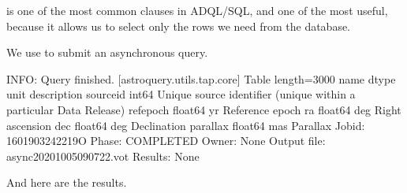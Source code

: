 \documentclass[letterpaper,10pt,english]{sphinxmanual}
\begin{document}
 is one of the most common clauses in ADQL/SQL, and one of the most useful, because it allows us to select only the rows we need from the database.

We use  to submit an asynchronous query.

\begin{sphinxVerbatim}[commandchars=\\\{\}]
  
\end{sphinxVerbatim}

\begin{sphinxVerbatim}[commandchars=\\\{\}]
INFO: Query finished. [astroquery.utils.tap.core]
\PYGZlt{}Table length=3000\PYGZgt{}
   name    dtype  unit                            description                            
\PYGZhy{}\PYGZhy{}\PYGZhy{}\PYGZhy{}\PYGZhy{}\PYGZhy{}\PYGZhy{}\PYGZhy{}\PYGZhy{} \PYGZhy{}\PYGZhy{}\PYGZhy{}\PYGZhy{}\PYGZhy{}\PYGZhy{}\PYGZhy{} \PYGZhy{}\PYGZhy{}\PYGZhy{}\PYGZhy{} \PYGZhy{}\PYGZhy{}\PYGZhy{}\PYGZhy{}\PYGZhy{}\PYGZhy{}\PYGZhy{}\PYGZhy{}\PYGZhy{}\PYGZhy{}\PYGZhy{}\PYGZhy{}\PYGZhy{}\PYGZhy{}\PYGZhy{}\PYGZhy{}\PYGZhy{}\PYGZhy{}\PYGZhy{}\PYGZhy{}\PYGZhy{}\PYGZhy{}\PYGZhy{}\PYGZhy{}\PYGZhy{}\PYGZhy{}\PYGZhy{}\PYGZhy{}\PYGZhy{}\PYGZhy{}\PYGZhy{}\PYGZhy{}\PYGZhy{}\PYGZhy{}\PYGZhy{}\PYGZhy{}\PYGZhy{}\PYGZhy{}\PYGZhy{}\PYGZhy{}\PYGZhy{}\PYGZhy{}\PYGZhy{}\PYGZhy{}\PYGZhy{}\PYGZhy{}\PYGZhy{}\PYGZhy{}\PYGZhy{}\PYGZhy{}\PYGZhy{}\PYGZhy{}\PYGZhy{}\PYGZhy{}\PYGZhy{}\PYGZhy{}\PYGZhy{}\PYGZhy{}\PYGZhy{}\PYGZhy{}\PYGZhy{}\PYGZhy{}\PYGZhy{}\PYGZhy{}\PYGZhy{}\PYGZhy{}
source\PYGZus{}id   int64      Unique source identifier (unique within a particular Data Release)
ref\PYGZus{}epoch float64   yr                                                    Reference epoch
       ra float64  deg                                                    Right ascension
      dec float64  deg                                                        Declination
 parallax float64  mas                                                           Parallax
Jobid: 1601903242219O
Phase: COMPLETED
Owner: None
Output file: async\PYGZus{}20201005090722.vot
Results: None
\end{sphinxVerbatim}

And here are the results.

\begin{sphinxVerbatim}[commandchars=\\\{\}]
  
\end{sphinxVerbatim}
\end{document}
